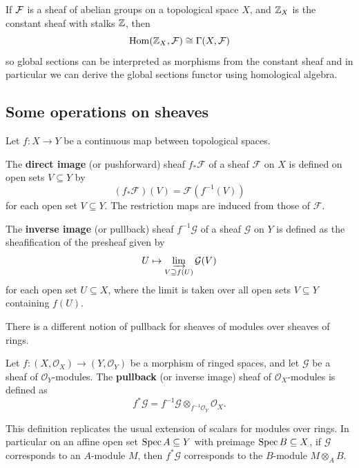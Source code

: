 \documentclass[12pt]{article}
\begin{document}
\begin{example}
     If ${\mathcal{F}}$ is a sheaf of abelian groups on a topological space $X$, and $\mathbb{Z}_X$ is the constant sheaf with stalks $\mathbb{Z}$, then \[\operatorname{Hom}(\mathbb{Z}_X, {\mathcal{F}}) \cong \Gamma(X, {\mathcal{F}})\] so global sections can be interpreted as morphisms from the constant sheaf and in particular we can derive the global sections functor using homological algebra.
\end{example}

\subsection{Some operations on sheaves}
Let $f: X \to Y$ be a continuous map between topological spaces.

\begin{definition}
    The \textbf{direct image} (or pushforward) sheaf $f_* \mathcal{F}$ of a sheaf $\mathcal{F}$ on $X$ is defined on open sets $V \subseteq Y$ by
    \[(f_* \mathcal{F})(V) = \mathcal{F}(f^{-1}(V))\]
    for each open set $V \subseteq Y$. The restriction maps are induced from those of $\mathcal{F}$.
\end{definition}

\begin{definition}
    The \textbf{inverse image} (or pullback) sheaf $f^{-1} \mathcal{G}$ of a sheaf $\mathcal{G}$ on $Y$ is defined as the sheafification of the presheaf given by
    \[U \mapsto \varinjlim_{V \supseteq f(U)} \mathcal{G}(V)\]
    for each open set $U \subseteq X$, where the limit is taken over all open sets $V \subseteq Y$ containing $f(U)$.
\end{definition}

There is a different notion of pullback for sheaves of modules over sheaves of rings.
\begin{definition}
    Let $f: (X, \mathcal{O}_X) \to (Y, \mathcal{O}_Y)$ be a morphism of ringed spaces, and let $\mathcal{G}$ be a sheaf of $\mathcal{O}_Y$-modules. The \textbf{pullback} (or inverse image) sheaf of $\mathcal{O}_X$-modules is defined as
    \[f^* \mathcal{G} = f^{-1} \mathcal{G} \otimes_{f^{-1} \mathcal{O}_Y} \mathcal{O}_X.\]
\end{definition}
This definition replicates the usual extension of scalars for modules over rings. In particular on an affine open set $\operatorname{Spec} A \subseteq Y$ with preimage $\operatorname{Spec} B \subseteq X$, if $\mathcal{G}$ corresponds to an $A$-module $M$, then $f^* \mathcal{G}$ corresponds to the $B$-module $M \otimes_A B$.
\end{document}

